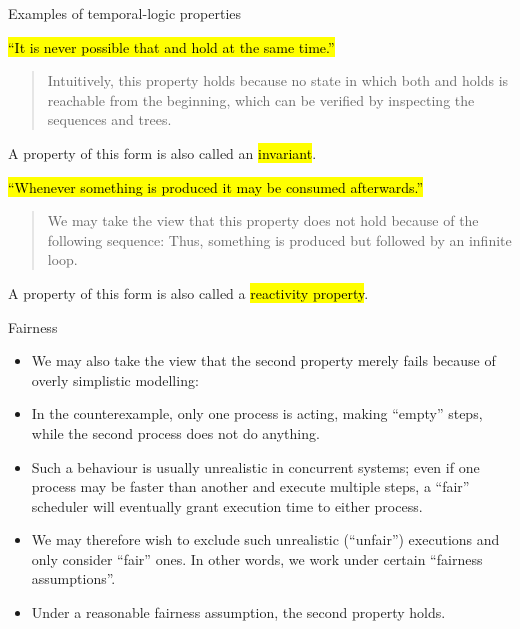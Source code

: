 
\begin{frame}{Examples of temporal-logic properties}

\hl{``It is never possible that 
  and  hold at the same time.''}
\begin{quote}
Intuitively, this property holds because no state in which
both  and  holds is reachable
from the beginning, which can be verified by inspecting the
sequences and trees.
\end{quote}
A property of this form is also called an \hl{invariant}.

\bigskip
\hl{``Whenever something is produced it may be consumed afterwards.''}
\begin{quote}
We may take the view that this property does not hold because of
the following sequence:
Thus, something is produced but followed by an infinite loop.
\end{quote}
A property of this form is also called a \hl{reactivity property}.
\end{frame}


\begin{frame}{Fairness}
\begin{itemize}
\item We may also take the view that the second property merely fails
   because of overly simplistic modelling:
\item In the counterexample, only one process is acting, making ``empty''
   steps, while the second process does not do anything.
\item Such a behaviour is usually unrealistic in concurrent systems;
   even if one process may be faster than another and execute multiple
   steps, a ``fair'' scheduler will eventually grant execution time
   to either process.
\item We may therefore wish to exclude such unrealistic (``unfair'') executions
   and only consider ``fair'' ones. In other words, we work under certain
   ``fairness assumptions''.
\item Under a reasonable fairness assumption, the second property holds.
\end{itemize}
\end{frame}


